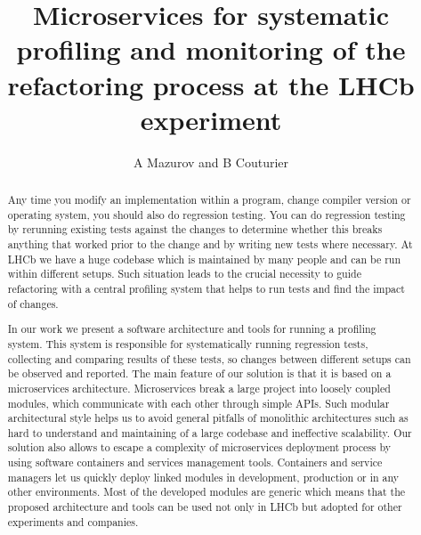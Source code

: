 \documentclass[a4paper]{jpconf}
\begin{document}
\title{Microservices for systematic profiling and monitoring of the refactoring process at the LHCb experiment}
\author{A Mazurov and B Couturier}
\thispagestyle{fancy}
\address{ University of Birmingham, Birmingham, United Kingdom}
\address{ CERN, European Organization for Nuclear Research, Geneva, Switzerland}




\newcommand\iamp{{Intel\textsuperscript{\textregistered} VTune\texttrademark Amplifier XE} }
\newcommand\amp{{VTune\texttrademark Amplifier XE} }
\newcommand\intel{{Intel\textsuperscript{\textregistered}} }
\newcommand\google{{Google\textsuperscript{\textregistered} }}

\begin{abstract}
Any time you modify an implementation within a program, change compiler version
or operating system, you should also do regression testing. You can do
regression testing by rerunning existing tests against the changes to determine
whether this breaks anything that worked prior to the change and by writing new
tests where necessary. At LHCb we have a huge codebase which is maintained by
many people and can be run within different setups. Such situation leads to the
crucial necessity to guide refactoring with a central profiling system that
helps to run tests and find the impact of changes.

In our work we present a software architecture and tools for running a profiling
system. This system is responsible for systematically running regression tests,
collecting and comparing results of these tests, so changes between different
setups can be observed and reported. The main feature of our solution is that it
is based on a microservices architecture. Microservices break a large project
into loosely coupled modules, which communicate with each other through simple
APIs. Such modular architectural style helps us to avoid general pitfalls of
monolithic architectures such as hard to understand and maintaining of a large
codebase and ineffective scalability. Our solution also allows to escape a
complexity of microservices deployment process by using software containers and
services management tools. Containers and service managers let us quickly deploy
linked modules in development, production or in any other environments. Most of
the developed modules are generic which means that the proposed architecture and
tools can be used not only in LHCb but adopted for other experiments and
companies. \end{abstract}
\end{document}
